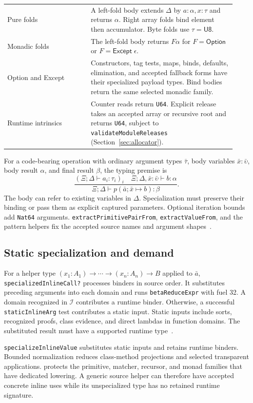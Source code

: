 \documentclass[11pt]{article}
\newcommand{\code}[1]{\texttt{#1}}
\newcommand{\longcode}[1]{\texttt{\seqsplit{#1}}}
\newcommand{\ty}[1]{\mathsf{#1}}
\newcommand{\I}{\mathcal{I}}
\begin{document}
\begin{longtable}{L{0.34\linewidth}L{0.59\linewidth}}
Pure folds & A left-fold body extends $\Delta$ by $a:\alpha,x:\tau$ and returns $\alpha$.  Right array folds bind element then accumulator.  Byte folds use $\tau=\ty{U8}$.\\
Monadic folds & The left-fold body returns $F\alpha$ for $F=\ty{Option}$ or $F=\ty{Except}\;\epsilon$.\\
Option and Except & Constructors, tag tests, maps, binds, defaults, elimination, and accepted fallback forms have their specialized payload types.  Bind bodies return the same selected monadic family.\\
Runtime intrinsics & Counter reads return \code{U64}.  Explicit release takes an accepted array or recursive root and returns \code{U64}, subject to \code{validateModuleReleases} (Section~\ref{sec:allocator}).\\
\bottomrule
\end{longtable}

For a code-bearing operation with ordinary argument types $\bar\tau$, body variables $\bar x:\bar\upsilon$, body result $\alpha$, and final result $\beta$, the typing premise is
\[
\frac{(\Xi;\Delta\vdash a_i:\tau_i)_i\quad
       \Xi;\Delta,\bar x:\bar\upsilon\vdash b:\alpha}
      {\Xi;\Delta\vdash p(\bar a;\bar x\mapsto b):\beta}.
\]
The body can refer to existing variables in $\Delta$.  Specialization must preserve their binding or pass them as explicit captured parameters.  Optional iteration bounds add \code{Nat64} arguments.  \code{extractPrimitivePairFrom}, \code{extractValueFrom}, and the pattern helpers fix the accepted source names and argument shapes~\cite{extract,patterns}.

\subsection{Static specialization and demand}

For a helper type $(x_1:A_1)\to\cdots\to(x_n:A_n)\to B$ applied to $\bar a$, \code{specializedInlineCall?} processes binders in source order.  It substitutes preceding arguments into each domain and runs \code{betaReduceExpr} with fuel 32.  A domain recognized in $\I$ contributes a runtime binder.  Otherwise, a successful \code{staticInlineArg} test contributes a static input.  Static inputs include sorts, recognized proofs, class evidence, and direct lambdas in function domains.  The substituted result must have a supported runtime type~\cite{types}.

\code{specializeInlineValue} substitutes static inputs and retains runtime binders.  Bounded normalization reduces class-method projections and selected transparent applications.  \longcode{blocksTransparentSpecialization} protects the primitive, matcher, recursor, and monad families that have dedicated lowering.  A generic source helper can therefore have accepted concrete inline uses while its unspecialized type has no retained runtime signature.
\end{document}
